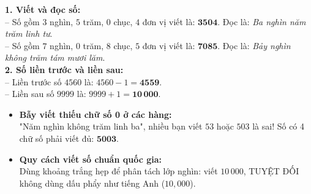 \documentclass[11pt,a4paper]{article}
\begin{document}
\vspace{-2.5mm}
\noindent
\begin{minipage}[t]{0.49\textwidth}\vspace{0pt}
\begin{tcolorbox}[
  enhanced,
  colback=green!4!white,
  colframe=green!60!black,
  arc=2mm, boxrule=0.8pt,
  left=2mm, right=2mm, top=1.8mm, bottom=1.8mm,
  title={\footnotesize\bfseries\color{white}\faCheckCircle\ Ví dụ thực hành chuẩn mực}
]
{\footnotesize
\textbf{1. Viết và đọc số:}\\
-- Số gồm $3$ nghìn, $5$ trăm, $0$ chục, $4$ đơn vị viết là: $\mathbf{3504}$. Đọc là: \textit{Ba nghìn năm trăm linh tư}.\\
-- Số gồm $7$ nghìn, $0$ trăm, $8$ chục, $5$ đơn vị viết là: $\mathbf{7085}$. Đọc là: \textit{Bảy nghìn không trăm tám mươi lăm}.\\
\textbf{2. Số liền trước và liền sau:}\\
-- Liền trước số $4560$ là: $4560 - 1 = \mathbf{4559}$.\\
-- Liền sau số $9999$ là: $9999 + 1 = \mathbf{10\,000}$.
}
\end{tcolorbox}
\end{minipage}
\hfill
\begin{minipage}[t]{0.49\textwidth}\vspace{0pt}
\begin{tcolorbox}[
  enhanced,
  colback=red!4!white,
  colframe=red!70!black,
  arc=2mm, boxrule=0.8pt,
  left=2mm, right=2mm, top=1.8mm, bottom=1.8mm,
  title={\footnotesize\bfseries\color{white}\faExclamationTriangle\ Mẹo tránh bẫy trắc nghiệm}
]
{\footnotesize
\begin{itemize}\setlength{\itemsep}{1.5pt}\setlength{\leftskip}{-2.5mm}
  \item \textbf{Bẫy viết thiếu chữ số 0 ở các hàng:}\\
  "Năm nghìn không trăm linh ba", nhiều bạn viết $53$ hoặc $503$ là sai! Số có 4 chữ số phải viết đủ: $\mathbf{5003}$.
  \item \textbf{Quy cách viết số chuẩn quốc gia:}\\
  Dùng khoảng trắng hẹp để phân tách lớp nghìn: viết $10\,000$, TUYỆT ĐỐI không dùng dấu phẩy như tiếng Anh ($10,000$).
\end{itemize}
}
\end{tcolorbox}
\end{minipage}
\end{document}
